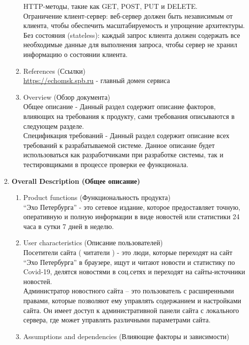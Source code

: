 \begin{enumerate}
\begin{enumerate}[label=1.\arabic*]
        HTTP-методы, такие как GET, POST, PUT и DELETE.\\
        \quad Ограничение клиент-сервер: веб-сервер должен быть независимым от клиента, чтобы обеспечить масштабируемость
        и упрощение архитектуры.\\
        \quad Без состояния (stateless): каждый запрос клиента должен содержать все необходимые данные для выполнения
        запроса, чтобы сервер не хранил информацию о состоянии клиента.
        \item References (Ссылки) \\
        \url{https://echomsk.spb.ru}  - главный домен сервиса
        \item Overview (Обзор документа) \\
        Общее описание - Данный раздел содержит описание факторов, влияющих на требования к продукту, сами требования
        описываются в следующем разделе. \\
        Спецификация требований - Данный раздел содержит описание всех требований к разрабатываемой системе. Данное
        описание будет использоваться как разработчиками при разработке системы, так и тестировщиками в процессе проверки ее функционала.
    \end{enumerate}
    \BgThispage
    \item \textbf{Overall Description (Общее описание)}
    \begin{enumerate}[label=2.\arabic*]
        \item Product functions (Функциональность продукта) \\
        ``Эхо Петербурга'' - это сетевое издание, которое предоставляет точную, оперативную и полную информации в
        виде новостей или статистики 24 часа в сутки 7 дней в неделю.
        \item User characteristics (Описание пользователей) \\
        Посетители сайта ( читатели ) - это люди, которые переходят на сайт ``Эхо Петербурга'' в браузере, ищут и
        читают новости и статистику по Covid-19, делятся новостями в соц.сетях и переходят на сайты-источники новостей. \\
        Администратор новостного сайта – это пользователь с расширенными правами, которые позволяют ему управлять содержанием и настройками сайта.
        Он имеет доступ к административной панели сайта с локального сервера, где может управлять различными параметрами сайта.
        \item Assumptions and dependencies (Влияющие факторы и зависимости) \\

\end{enumerate}
\end{enumerate}
